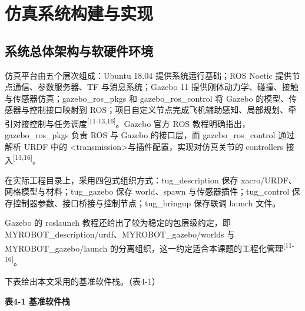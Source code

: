 
\chapter{仿真系统构建与实现}

\section{系统总体架构与软硬件环境}

仿真平台由五个层次组成：Ubuntu 18.04 提供系统运行基础；ROS Noetic
提供节点通信、参数服务器、TF 与消息系统；Gazebo 11
提供刚体动力学、碰撞、接触与传感器仿真；gazebo\_ros\_pkgs 和 gazebo\_ros\_control 将
Gazebo 的模型、传感器与控制接口映射到
ROS；项目自定义节点完成飞机辅助感知、局部规划、牵引对接控制与任务调度\textsuperscript{[11-13,16]}。Gazebo
官方 ROS 教程明确指出，gazebo\_ros\_pkgs 负责 ROS 与 Gazebo
的接口层，而 gazebo\_ros\_control 通过解析 URDF
中的 \textless transmission\textgreater 与插件配置，实现对仿真关节的
controllers 接入\textsuperscript{[13,16]}。

在实际工程目录上，采用四包式组织方式：tug\_description 保存
xacro/URDF、网格模型与材料；tug\_gazebo 保存 world、spawn
与传感器插件；tug\_control 保存控制器参数、接口桥接与控制节点；tug\_bringup 保存联调
launch 文件。

Gazebo
的 roslaunch 教程还给出了较为稳定的包层级约定，即 MYROBOT\_description/urdf、MYROBOT\_gazebo/worlds 与 MYROBOT\_gazebo/launch 的分离组织，这一约定适合本课题的工程化管理\textsuperscript{[11-16]}。

下表给出本文采用的基准软件栈。（表4-1）

\begin{center}\textbf{表4-1 基准软件栈}\end{center}

